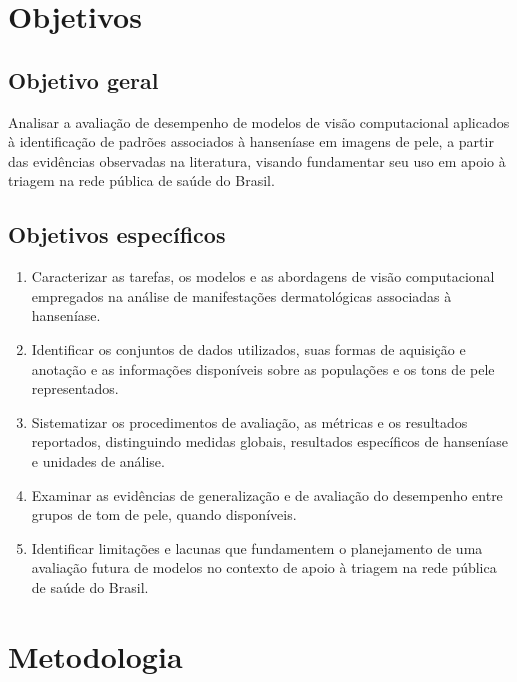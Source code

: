 \section{Objetivos}\label{objetivos}

\subsection{Objetivo geral}\label{objetivo-geral}

Analisar a avaliação de desempenho de modelos de visão computacional
aplicados à identificação de padrões associados à hanseníase em imagens
de pele, a partir das evidências observadas na literatura, visando
fundamentar seu uso em apoio à triagem na rede pública de saúde do
Brasil.

\subsection{Objetivos específicos}\label{objetivos-especuxedficos}

\begin{enumerate}
	\def\labelenumi{\arabic{enumi}.}
	\tightlist
	\item
	      Caracterizar as tarefas, os modelos e as abordagens de visão
	      computacional empregados na análise de manifestações dermatológicas
	      associadas à hanseníase.
	\item
	      Identificar os conjuntos de dados utilizados, suas formas de aquisição
	      e anotação e as informações disponíveis sobre as populações e os tons
	      de pele representados.
	\item
	      Sistematizar os procedimentos de avaliação, as métricas e os
	      resultados reportados, distinguindo medidas globais, resultados
	      específicos de hanseníase e unidades de análise.
	\item
	      Examinar as evidências de generalização e de avaliação do desempenho
	      entre grupos de tom de pele, quando disponíveis.
	\item
	      Identificar limitações e lacunas que fundamentem o planejamento de uma
	      avaliação futura de modelos no contexto de apoio à triagem na rede
	      pública de saúde do Brasil.
\end{enumerate}

\section{Metodologia}

